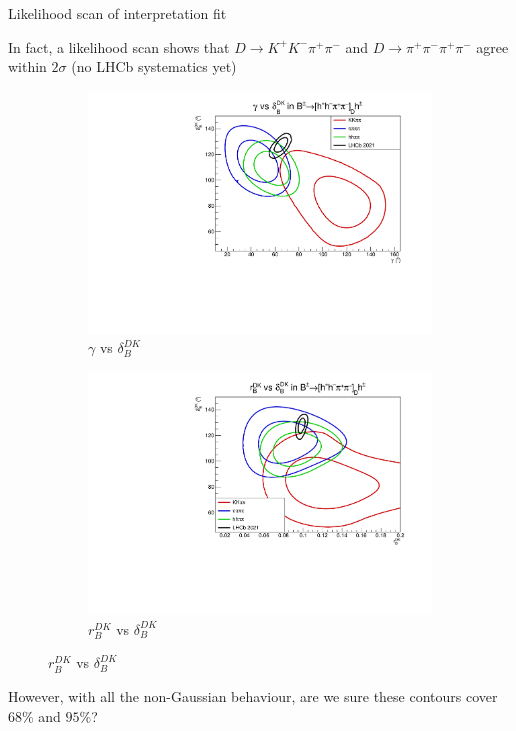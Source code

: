 \documentclass{beamer}
\begin{document}
\begin{frame}{Likelihood scan of interpretation fit}
  \begin{center}
    In fact, a likelihood scan shows that $D\to K^+K^-\pi^+\pi^-$ and $D\to\pi^+\pi^-\pi^+\pi^-$ agree within $2\sigma$ (no LHCb systematics yet)
  \end{center}
  \begin{figure}
    \centering
    \begin{subfigure}{0.50\textwidth}
      \centering
      \includegraphics[width=1.0\textwidth]{Plots/gamma_deltaB_hhpipi_LHCb_Prob_scan.pdf}
      \caption*{$\gamma$ vs $\delta_B^{DK}$}
    \end{subfigure}%
    \begin{subfigure}{0.50\textwidth}
      \centering
      \includegraphics[width=1.0\textwidth]{Plots/rB_deltaB_hhpipi_LHCb_Prob_scan.pdf}
      \caption*{$r_B^{DK}$ vs $\delta_B^{DK}$}
    \end{subfigure}
  \end{figure}
  \vspace{-0.3cm}
  \begin{center}
    However, with all the non-Gaussian behaviour, are we sure these contours cover $68\%$ and $95\%$\phantom{y}?
  \end{center}
\end{frame}
\end{document}
